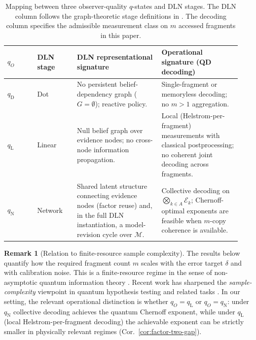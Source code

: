 \documentclass[11pt]{article}
\newcommand{\cE}{\mathcal{E}}
\newcommand{\1}{\mathbf{1}}
\theoremstyle{definition}
\newtheorem{remark}{Remark}
\theoremstyle{plain}
\begin{document}
\begin{table}[t]
\caption{Mapping between three observer-quality $q$-states and DLN stages. The DLN column follows the graph-theoretic stage definitions in \citet{WuDLNCompression2026preprint}. The decoding column specifies the admissible measurement class on $m$ accessed fragments in this paper.}
\label{tab:q-dln-mapping}
\centering
\small
\begin{tabular}{p{0.12\linewidth} p{0.16\linewidth} p{0.34\linewidth} p{0.32\linewidth}}
\toprule
$q_O$ & DLN stage & DLN representational signature & Operational signature (QD decoding) \\
\midrule
$q_{\mathrm{D}}$ & Dot &
No persistent belief-dependency graph ($G=\emptyset$); reactive policy. &
Single-fragment or memoryless decoding; no $m>1$ aggregation. \\
\midrule
$q_{\mathrm{L}}$ & Linear &
Null belief graph over evidence nodes; no cross-node information propagation. &
Local (Helstrom-per-fragment) measurements with classical postprocessing; no coherent joint decoding across fragments. \\
\midrule
$q_{\mathrm{N}}$ & Network &
Shared latent structure connecting evidence nodes (factor reuse) and, in the full DLN instantiation, a model-revision cycle over $\mathcal{M}$.
&
Collective decoding on $\bigotimes_{k\in A}\cE_k$; Chernoff-optimal exponents are feasible when $m$-copy coherence is available. \\
\bottomrule
\end{tabular}
\end{table}

\begin{remark}[Relation to finite-resource sample complexity]
The results below quantify how the required fragment count $m$ scales with the error target $\delta$ and with calibration noise.
This is a finite-resource regime in the sense of non-asymptotic quantum information theory \citep{Tomamichel2016,AudenaertMosonyiVerstraete2012}.
Recent work has sharpened the \emph{sample-complexity} viewpoint in quantum hypothesis testing and related tasks \citep{ChengDattaLiuNuradhaSalzmannWilde2025}.
In our setting, the relevant operational distinction is whether $q_O=q_{\mathrm{L}}$ or $q_O=q_{\mathrm{N}}$:
under $q_{\mathrm{N}}$ collective decoding achieves the quantum Chernoff exponent, while under $q_{\mathrm{L}}$ (local Helstrom-per-fragment decoding) the achievable exponent can be strictly smaller in physically relevant regimes (Cor.~\ref{cor:factor-two-gap}).
\end{remark}
\end{document}
